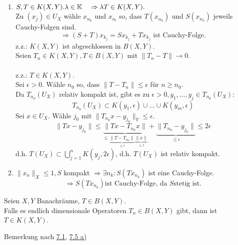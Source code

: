 \begin{beweis}
	\begin{enumerate}[label=\alph*\upshape)]
		\item $S, T \in K(X, Y). \lambda \in \mathbb{K} \quad \Rightarrow \lambda T \in K(X, Y).$ \\
			Zu $(x_j) \in U_X$ wähle $x_{n_{k}}$ und $x_{n_{l}}$ so, dass $T(x_{n_{k}})$ und $S(x_{n_{ö}})$ jeweils Cauchy-Folgen sind. \\
			\[ \Rightarrow (S + T) x_{k_{j}} = S x_{k_{j}} + T x_{k_{j}} \text{ ist Cauchy-Folge.} \] 
			z.z.: $K(X, Y)$ ist abgeschlossen in $B(X, Y)$. \\
			Seien $T_{n} \in K(X, Y), T \in B(X, Y)$ mit $\| T_{n} - T \| \rightarrow 0$. \\ \\
			z.z.: $T \in K(X, Y)$. \\
			Sei $\epsilon > 0$. Wähle $n_{0}$ so, dass $\| T - T_{n} \| \leq \epsilon$ für $n \geq n_{0}$. \\
			Da $T_{n_{0}}(U_{X})$ relativ kompakt ist, gibt es zu $\epsilon > 0, y_{1}, \dotsc, y_{j} \in T_{n_{0}}(U_{X}):$
			\[ T_{n_{0}}(U_{X}) \subset K(y_{1}, \epsilon) \cup \dotsc \cup K(y_{m}, \epsilon) \]
			Sei $x \in U_{X}$. Wähle $j_{0}$ mit $\| T_{n_{0}} x - y_{j_{0}} \|_{Y} \leq \epsilon$.
			\[ \| T x - y_{j_{0}} \| \leq \underbrace{\| T x - T_{n_{0}} x \|}_{\leq \underbrace{\| T - T_{n_{0}} \| }_{\leq \epsilon} \underbrace{\| x \|}_{\leq 1}} + \underbrace{\| T_{n_{0}} - y_{j_{0}} \|}_{\leq \epsilon} \leq 2 \epsilon \]
			d.h. $T(U_{X}) \subset \bigcup_{j = 1}^{n} K(y_{j}, 2 \epsilon)$, d.h. $T(U_{X})$ ist relativ kompakt.
		\item $\| x_{n} \|_{X} \leq 1, S$ kompakt $\Rightarrow \exists n_{k}: S( T x_{n_{k}} ) $ ist eine Cauchy-Folge. 
			\[ \Rightarrow S( T x_{n_{k}} ) \text{ist Cauchy-Folge, da } S \text{stetig ist.} \] 
	\end{enumerate}	
\end{beweis}


\begin{kor} \label{kor:7.6}
	Seien $X, Y$ Banachräume, $T \in B(X, Y)$. \\
	Falls es endlich dimensionale Operatoren $T_{n} \in B(X, Y)$ gibt, dann ist $T \in K(X, Y)$.
	\begin{beweis}
		Bemerkung nach \hyperref[def:7.1-kompktOperator]{7.1}, \hyperref[satz:7-5a]{7.5 a)}	
	\end{beweis}
\end{kor}


